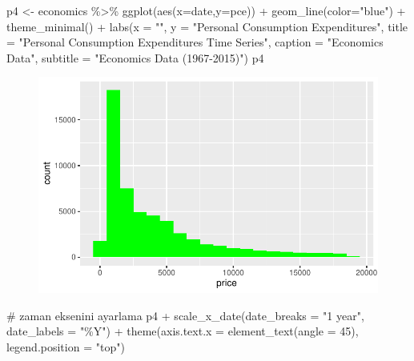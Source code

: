 \documentclass[
  letterpaper,
  DIV=11,
  numbers=noendperiod]{scrreprt}
\newenvironment{Shaded}{\begin{snugshade}}{\end{snugshade}}
\newcommand{\AttributeTok}[1]{\textcolor[rgb]{0.40,0.45,0.13}{#1}}
\newcommand{\CommentTok}[1]{\textcolor[rgb]{0.37,0.37,0.37}{#1}}
\newcommand{\DecValTok}[1]{\textcolor[rgb]{0.68,0.00,0.00}{#1}}
\newcommand{\FunctionTok}[1]{\textcolor[rgb]{0.28,0.35,0.67}{#1}}
\newcommand{\NormalTok}[1]{\textcolor[rgb]{0.00,0.23,0.31}{#1}}
\newcommand{\OtherTok}[1]{\textcolor[rgb]{0.00,0.23,0.31}{#1}}
\newcommand{\SpecialCharTok}[1]{\textcolor[rgb]{0.37,0.37,0.37}{#1}}
\newcommand{\StringTok}[1]{\textcolor[rgb]{0.13,0.47,0.30}{#1}}
\begin{document}
\begin{Shaded}
\begin{Highlighting}[]
\NormalTok{p4 }\OtherTok{\textless{}{-}}\NormalTok{ economics }\SpecialCharTok{\%\textgreater{}\%} 
  \FunctionTok{ggplot}\NormalTok{(}\FunctionTok{aes}\NormalTok{(}\AttributeTok{x=}\NormalTok{date,}\AttributeTok{y=}\NormalTok{pce)) }\SpecialCharTok{+}
  \FunctionTok{geom\_line}\NormalTok{(}\AttributeTok{color=}\StringTok{"blue"}\NormalTok{) }\SpecialCharTok{+}
  \FunctionTok{theme\_minimal}\NormalTok{() }\SpecialCharTok{+}
  \FunctionTok{labs}\NormalTok{(}\AttributeTok{x =} \StringTok{""}\NormalTok{,}
       \AttributeTok{y =} \StringTok{"Personal Consumption Expenditures"}\NormalTok{,}
       \AttributeTok{title =} \StringTok{"Personal Consumption Expenditures Time Series"}\NormalTok{,}
       \AttributeTok{caption =} \StringTok{"Economics Data"}\NormalTok{,}
       \AttributeTok{subtitle =} \StringTok{"Economics Data (1967{-}2015)"}\NormalTok{)}
\NormalTok{p4}
\end{Highlighting}
\end{Shaded}

\begin{figure}[H]

{\centering \includegraphics{ggplot2_files/figure-pdf/unnamed-chunk-2-1.pdf}

}

\end{figure}

\begin{Shaded}
\begin{Highlighting}[]
\CommentTok{\# zaman eksenini ayarlama}
\NormalTok{p4 }\SpecialCharTok{+} 
  \FunctionTok{scale\_x\_date}\NormalTok{(}\AttributeTok{date\_breaks =} \StringTok{"1 year"}\NormalTok{, }\AttributeTok{date\_labels =} \StringTok{"\%Y"}\NormalTok{) }\SpecialCharTok{+}
  \FunctionTok{theme}\NormalTok{(}\AttributeTok{axis.text.x =} \FunctionTok{element\_text}\NormalTok{(}\AttributeTok{angle =} \DecValTok{45}\NormalTok{), }\AttributeTok{legend.position =} \StringTok{"top"}\NormalTok{)}
\end{Highlighting}
\end{Shaded}
\end{document}
